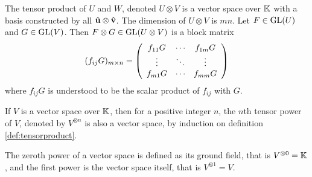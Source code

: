 	\begin{definition}\label{def:tensorproduct}
		The tensor product of $U$ and $W$, denoted $U \otimes V$ is a vector space over $\mathbb{K}$ with a basis constructed by all $\mathbf{\hat{u}} \otimes \mathbf{\hat{v}}$. The dimension of $U \otimes V$ is $mn$. Let $F \in \text{GL}(U)$ and $G \in \text{GL}(V)$. Then $F \otimes G \in \text{GL}(U \otimes V)$ is a block matrix
		\begin{align}
			(f_{ij}G)_{m \times n}=
			\left(
			\begin{array}{c c c}
				f_{11}G & \cdots & f_{1m}G \\
				\vdots & \ddots & \vdots \\
				f_{m1}G & \cdots & f_{mm}G
			\end{array}
			\right)			
		\end{align}
		where $f_{ij}G$ is understood to be the scalar product of $f_{ij}$ with $G$.
	\end{definition}
	
	\begin{definition}
		If $V$ is a vector space over $\mathbb{K}$, then for a positive integer $n$, the $n$th tensor power of $V$, denoted by $V^{\otimes n}$ is also a vector space, by induction on definition \ref{def:tensorproduct}.
		\begin{notation}
			The zeroth power of a vector space is defined as its ground field, that is $V^{\otimes 0} = \mathbb{K}$, and the first power is the vector space itself, that is $V^{\otimes 1} = V$.
		\end{notation}    
	\end{definition}